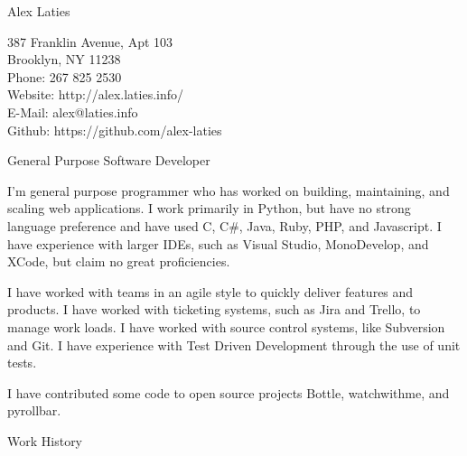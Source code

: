 \documentclass[a4paper]{article}
\begin{document}
    \begin{minipage}[t][4em][c]{0.5 \textwidth}
        \begin{LARGE}
            Alex Laties \\
        \end{LARGE}
        387 Franklin Avenue, Apt 103\\
        Brooklyn, NY 11238\\
        Phone: 267 825 2530\\
        Website: http://alex.laties.info/ \\
        E-Mail: alex@laties.info \\
        Github: https://github.com/alex-laties \\
    \end{minipage}
    \begin{minipage}[t][10em][c]{0.5 \textwidth}
        \vspace{3em}
        \begin{Large}
            General Purpose Software Developer
        \end{Large}

        \begingroup
            \fontsize{8pt}{12pt}\selectfont
            I'm general purpose programmer who has worked on building, maintaining, and scaling web applications. I work primarily in Python, but have no strong language preference and have used C, C\#, Java, Ruby, PHP, and Javascript.  I have experience with larger IDEs, such as Visual Studio, MonoDevelop, and XCode, but claim no great proficiencies. \\
            \par
            I have worked with teams in an agile style to quickly deliver features and products. I have worked with ticketing systems, such as Jira and Trello, to manage work loads. I have worked with source control systems, like Subversion and Git. I have experience with Test Driven Development through the use of unit tests. \\
            \par
            I have contributed some code to open source projects Bottle, watchwithme, and pyrollbar.\\
        \endgroup
    \end{minipage}

    \vspace{4em}

    \begin{Large}
        Work History
    \end{Large}
\end{document}

